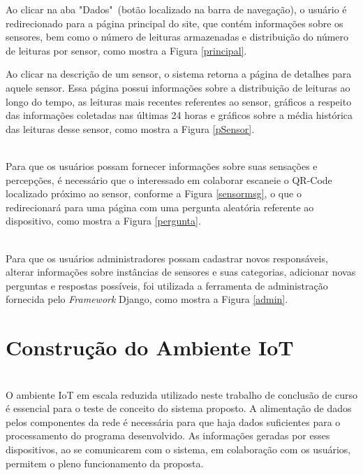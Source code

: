 \newpage
\null \quad Ao clicar na aba "Dados"\ (botão localizado na barra de navegação), o usuário é redirecionado para a página principal do site, que contém informações sobre os sensores, bem como o número de leituras armazenadas e distribuição do número de leituras por sensor, como mostra a Figura \ref{principal}.

\newpage
\null \quad Ao clicar na descrição de um sensor, o sistema retorna a página de detalhes para aquele sensor. Essa página possui informações sobre a distribuição de leituras ao longo do tempo, as leituras mais recentes referentes ao sensor, gráficos a respeito das informações coletadas nas últimas 24 horas e gráficos sobre a média histórica das leituras desse sensor, como mostra a Figura \ref{pSensor}.
\newpage
{}


\\\null \quad Para que os usuários possam fornecer informações sobre suas sensações e percepções, é necessário que o interessado em colaborar escaneie o QR-Code localizado próximo ao sensor, conforme a Figura \ref{sensormsg}, o que o redirecionará para uma página com uma pergunta aleatória referente ao dispositivo, como mostra a Figura \ref{pergunta}.


\\\null \quad Para que os usuários administradores possam cadastrar novos responsáveis, alterar informações sobre instâncias de sensores e suas categorias, adicionar novas perguntas e respostas possíveis, foi utilizada a ferramenta de administração fornecida pelo \textit{Framework} Django, como mostra a Figura \ref{admin}.



\section{Construção do Ambiente IoT}
\label{sec:ambiente}
\\\null \quad O ambiente \acrshort{IoT} em escala reduzida utilizado neste trabalho de conclusão de curso é essencial para o teste de conceito
do sistema proposto. A alimentação de dados pelos componentes da rede é necessária para que haja
dados suficientes para o processamento do programa desenvolvido. As informações geradas por esses dispositivos, ao se comunicarem com o sistema, em colaboração
com os usuários, permitem o pleno funcionamento da proposta.


